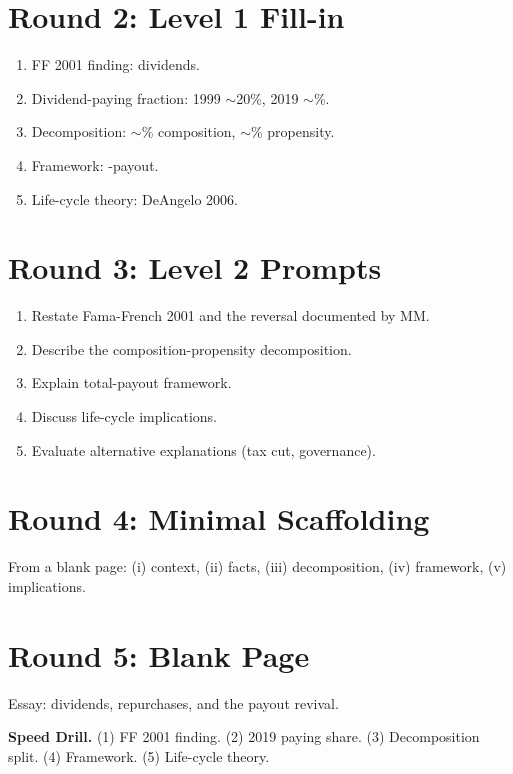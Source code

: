 \documentclass[11pt]{article}
\newcommand{\blank}[1]{\underline{\hspace{#1}}}
\begin{document}
\section*{Round 2: Level 1 Fill-in}
\begin{enumerate}
\item FF 2001 finding: \blank{2cm} dividends.
\item Dividend-paying fraction: 1999 $\sim$20\%, 2019 $\sim$\blank{1cm}\%.
\item Decomposition: $\sim$\blank{1cm}\% composition, $\sim$\blank{1cm}\% propensity.
\item Framework: \blank{2cm}-payout.
\item Life-cycle theory: DeAngelo \blank{1cm} 2006.
\end{enumerate}

\section*{Round 3: Level 2 Prompts}
\begin{enumerate}
\item Restate Fama-French 2001 and the reversal documented by MM.
\item Describe the composition-propensity decomposition.
\item Explain total-payout framework.
\item Discuss life-cycle implications.
\item Evaluate alternative explanations (tax cut, governance).
\end{enumerate}

\section*{Round 4: Minimal Scaffolding}
From a blank page: (i) context, (ii) facts, (iii) decomposition, (iv) framework, (v) implications.

\section*{Round 5: Blank Page}
Essay: dividends, repurchases, and the payout revival.

\vspace{6pt}
\begin{drillbox}
\textbf{Speed Drill.} (1) FF 2001 finding. (2) 2019 paying share. (3) Decomposition split. (4) Framework. (5) Life-cycle theory.
\end{drillbox}
\end{document}

